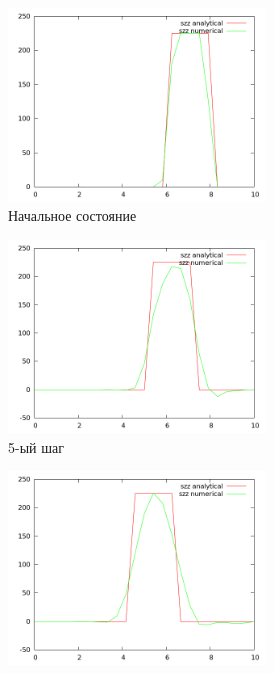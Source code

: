 \begin{figure}[H]
\begin{subfigure}[b]{0.5\textwidth}
\centering
\includegraphics[width=0.75\textwidth]{png/veryfication/0.8/p-wave-along-z0.png}
\caption{Начальное состояние}
\end{subfigure}
\begin{subfigure}[b]{0.5\textwidth}
\centering
\includegraphics[width=0.75\textwidth]{png/veryfication/0.8/p-wave-along-z5.png}
\caption{5-ый шаг}
\end{subfigure}
\begin{subfigure}[b]{0.5\textwidth}
\centering
\includegraphics[width=0.75\textwidth]{png/veryfication/0.8/p-wave-along-z10.png}

\end{subfigure}
\end{figure}
